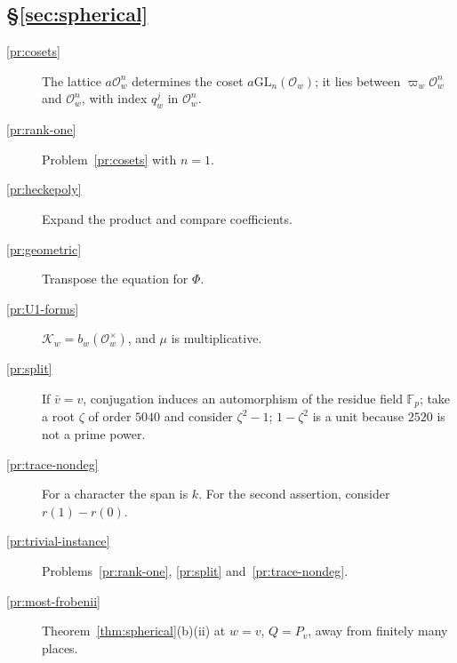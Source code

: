 \documentclass[reqno]{amsart}
\theoremstyle{definition}
\theoremstyle{plain}
\newcommand{\F}{\mathbb{F}}
\newcommand{\Oc}{\mathcal{O}}
\newcommand{\Kc}{\mathcal{K}}
\newcommand{\GL}{\mathrm{GL}}
\begin{document}
\subsection*{\S\ref{sec:spherical}}
\begin{description}
\item[\ref{pr:cosets}] The lattice \(a\Oc_w^n\) determines the coset \(a\GL_n(\Oc_w)\); it lies between \(\varpi_w\Oc_w^n\) and \(\Oc_w^n\), with index \(q_w^j\) in \(\Oc_w^n\).
\item[\ref{pr:rank-one}] Problem~\ref{pr:cosets} with \(n = 1\).
\item[\ref{pr:heckepoly}] Expand the product and compare coefficients.
\item[\ref{pr:geometric}] Transpose the equation for \(\Phi\).
\item[\ref{pr:U1-forms}] \(\Kc_w = b_w(\Oc_w^\times)\), and \(\mu\) is multiplicative.
\item[\ref{pr:split}] If \(\bar v = v\), conjugation induces an automorphism of the residue field \(\F_p\); take a root \(\zeta\) of order \(5040\) and consider \(\zeta^2 - 1\); \(1 - \zeta^2\) is a unit because \(2520\) is not a prime power.
\item[\ref{pr:trace-nondeg}] For a character the span is \(k\).  For the second assertion, consider \(r(1) - r(0)\).
\item[\ref{pr:trivial-instance}] Problems~\ref{pr:rank-one}, \ref{pr:split} and~\ref{pr:trace-nondeg}.
\item[\ref{pr:most-frobenii}] Theorem~\ref{thm:spherical}(b)(ii) at \(w = v\), \(Q = P_v\), away from finitely many places.
\end{description}
\end{document}
